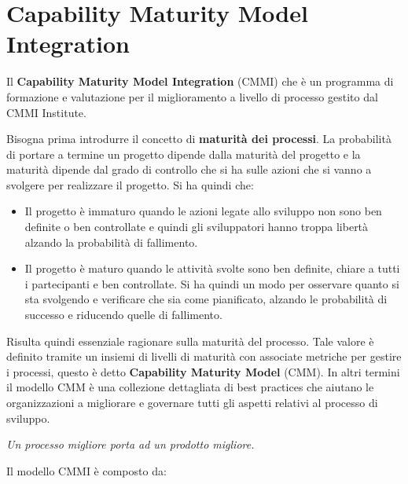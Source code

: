 \chapter{Capability Maturity Model Integration}
Il \textbf{Capability Maturity Model Integration} (CMMI) che è un programma di
formazione e valutazione per il miglioramento a livello di processo gestito dal
CMMI Institute.

Bisogna prima introdurre il concetto di \textbf{maturità dei processi}. La
probabilità di portare a termine un progetto dipende dalla maturità del progetto e
la maturità dipende dal grado di controllo che si ha sulle azioni che si vanno a
svolgere per realizzare il progetto. Si ha quindi che:
\begin{itemize}
      \item Il progetto è immaturo quando le azioni legate allo sviluppo non sono
            ben definite o ben controllate e quindi gli sviluppatori hanno troppa
            libertà alzando la probabilità di fallimento.
      \item Il progetto è maturo quando le attività svolte sono ben definite,
            chiare a tutti i partecipanti e ben controllate. Si ha quindi un modo per
            osservare quanto si sta svolgendo e verificare che sia come pianificato,
            alzando le probabilità di successo e riducendo quelle di fallimento.
\end{itemize}
Risulta quindi essenziale ragionare sulla maturità del processo. Tale valore è
definito tramite un insiemi di livelli di maturità con associate metriche per gestire
i processi, questo è detto \textbf{Capability Maturity Model} (CMM). In altri
termini il modello CMM è una collezione dettagliata di best practices che aiutano
le organizzazioni a migliorare e governare tutti gli aspetti relativi al
processo di sviluppo.
\begin{center}
      \textit{Un processo migliore porta ad un prodotto migliore.}
\end{center}
Il modello CMMI è composto da:

